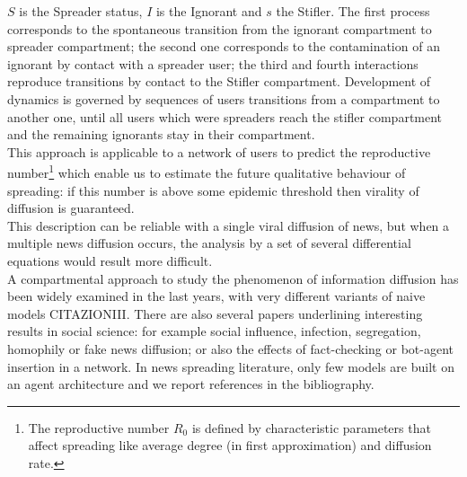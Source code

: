 $S$ is the Spreader status, $I$ is the Ignorant and $s$ the Stifler. 
The first process corresponds to the spontaneous transition from the ignorant compartment to spreader compartment;
 the second one corresponds to the contamination of an ignorant by contact with a spreader user; 
the third and fourth interactions reproduce transitions by contact to the Stifler compartment.
Development of dynamics is governed by sequences of users transitions from a compartment to another one, until all users which were spreaders reach the stifler compartment and the remaining ignorants stay in their compartment.\\
This approach is applicable to a network of users to predict the reproductive 
number\footnote{The reproductive number $R_{0}$ is defined by characteristic parameters that affect spreading like average degree (in first approximation) and diffusion rate. } 
which enable us to estimate the future qualitative behaviour of spreading: 
if this number is above some epidemic threshold then virality of diffusion is guaranteed.\\
This description can be reliable with a single viral diffusion of news, but when a
multiple news diffusion occurs, the analysis by a set of several differential equations would result more difficult.  
 \\ A compartmental approach to study the phenomenon of information diffusion has been widely examined in the last years, with very different variants of naive models CITAZIONIII.
There are also several papers underlining interesting results in social science: for example social influence, infection, segregation, homophily or fake news diffusion; or also the effects of fact-checking or bot-agent insertion in a network.
 In news spreading literature, only few models are built on an agent architecture and we report references in the bibliography.


